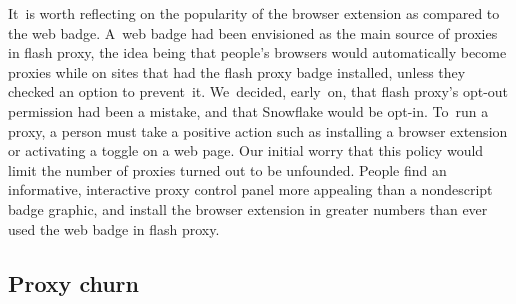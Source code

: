 \documentclass[letterpaper,twocolumn]{article}
\begin{document}
It~is worth reflecting
on the popularity of the browser extension
as compared to the web badge.
A~web badge had been envisioned
as the main source of proxies in flash proxy,
the idea being that people's browsers
would automatically become proxies
while on sites that had the flash proxy badge installed,
unless they checked an option to prevent~it.
We~decided, early~on, that flash proxy's opt-out permission had been a mistake,
%
and that Snowflake would be opt-in.
To~run a proxy, a person must take a positive action
such as installing a browser extension
or activating a toggle on a web page.
Our initial worry that this policy
would limit the number of proxies turned out to be unfounded.
People find an informative, interactive proxy control panel more appealing
than a nondescript badge graphic,
and install the browser extension in greater numbers
than ever used the web badge in flash proxy.

\subsection{Proxy churn}
\label{sec:proxy-churn}

\end{document}
